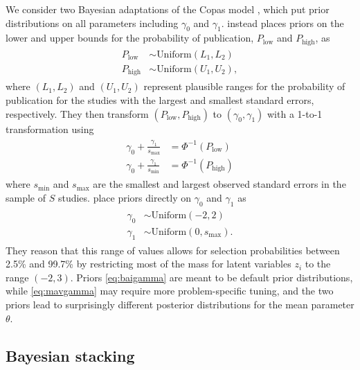 \documentclass[12pt]{article}   	%
\numberwithin{equation}{section}
\begin{document}
We consider two Bayesian adaptations of the Copas model \citep{mavridis2013copas, bai2020}, which put prior distributions on all parameters including $\gamma_0$ and $\gamma_1$. \citet{mavridis2013copas} instead places priors on the lower and upper bounds for the probability of publication, $P_{\text{low}}$ and $P_{\text{high}}$, as
\begin{align}
\begin{split}
P_{\text{low}} & \sim \text{Uniform}(L_1, L_2) \\
P_{\text{high}} & \sim \text{Uniform}(U_1, U_2), \label{eq:mavgamma}
\end{split}
\end{align} 
where $(L_1, L_2)$ and $(U_1, U_2)$ represent plausible ranges for the probability of publication for the studies with the largest and smallest standard errors, respectively. They then transform $(P_{\text{low}}, P_{\text{high}})$ to $(\gamma_0, \gamma_1)$ with a 1-to-1 transformation using
\begin{align}
\begin{split}
\gamma_0 + \frac{\gamma_1}{s_{\text{max}}} &= \Phi^{-1}(P_{\text{low}}) \\
\gamma_0 + \frac{\gamma_1}{s_{\text{min}}} &= \Phi^{-1}(P_{\text{high}})
\end{split}
\end{align} 
where $s_{\text{min}}$ and $s_{\text{max}}$ are the smallest and largest observed standard errors in the sample of $S$ studies. \citet{bai2020} place priors directly on $\gamma_0$ and $\gamma_1$ as
\begin{align}
\begin{split}
\gamma_0 & \sim \text{Uniform}(-2, 2) \\
\gamma_1 & \sim \text{Uniform}(0, s_{\text{max}}). \label{eq:baigamma}
\end{split}
\end{align}
They reason that this range of values allows for selection probabilities between 2.5\% and 99.7\% by restricting most of the mass for latent variables $z_i$ to the range $(-2, 3)$.
Priors \eqref{eq:baigamma} are meant to be default prior distributions, while \eqref{eq:mavgamma} may require more problem-specific tuning, and the two priors lead to surprisingly different posterior distributions for the mean parameter $\theta$. 

\subsection{Bayesian stacking} \label{sec:stacking}
\end{document}
